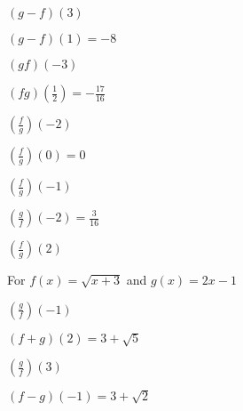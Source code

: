 \documentclass{ximera}
\begin{document}
\begin{question}
$(g - f)(3)$
\begin{solution}
$(g-f)(1) = -8$

\end{solution}

\end{question}

\begin{question}
$(gf)(-3)$

\begin{solution}
$(fg)\left(\frac{1}{2}\right) = -\frac{17}{16}$
\end{solution}

\end{question}

\begin{question}
$\left(\frac{f}{g}\right)(-2)$
\begin{solution}
$\left(\frac{f}{g}\right)(0) = 0$
\end{solution}

\end{question}

\begin{question}
$\left(\frac{f}{g}\right)(-1)$
\begin{solution}
$\left(\frac{g}{f}\right)\left(-2\right) = \frac{3}{16}$

\end{solution}

\end{question}

\begin{question}
$\left(\frac{f}{g}\right)(2)$

\begin{solution}
For $f(x) = \sqrt{x+3}$ and  $g(x) = 2x-1$


\end{solution}

\end{question}

\begin{question}
$\left(\frac{g}{f}\right)(-1)$
\begin{solution}
$(f+g)(2) = 3+\sqrt{5}$
\end{solution}

\end{question}

\begin{question}
$\left(\frac{g}{f}\right)(3)$
\begin{solution}
$(f-g)(-1) = 3+\sqrt{2}$
\end{solution}

\end{question}
\end{document}
